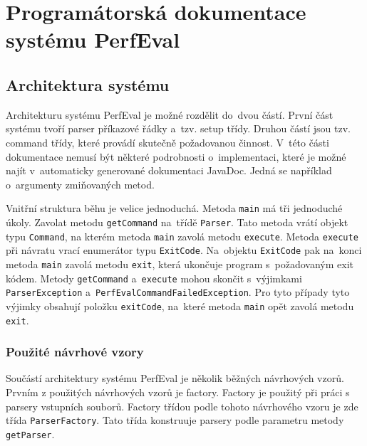 \chapter{Programátorská dokumentace systému PerfEval}

\section{Architektura systému}

Architekturu systému PerfEval je možné rozdělit do~dvou částí. První část systému tvoří
parser příkazové řádky a~tzv. setup třídy. Druhou částí jsou tzv. command třídy,
které provádí skutečně požadovanou činnost. V~této části dokumentace nemusí být
některé podrobnosti o~implementaci, které je možné najít v~automaticky generované dokumentaci
JavaDoc. Jedná se například o~argumenty zmiňovaných metod.

Vnitřní struktura běhu je velice jednoduchá. Metoda \lstinline{main} má tři jednoduché úkoly.
Zavolat metodu \lstinline{getCommand} na~třídě \lstinline{Parser}. Tato metoda vrátí objekt typu \lstinline{Command},
na kterém metoda \lstinline{main} zavolá metodu \lstinline{execute}. Metoda \lstinline{execute} při návratu vrací enumerátor
typu \lstinline{ExitCode}. Na~objektu \lstinline{ExitCode} pak na~konci metoda \lstinline{main} zavolá metodu \lstinline[keywords={}]{exit},
která ukončuje program s~požadovaným exit kódem. Metody \lstinline{getCommand} a~\lstinline{execute} mohou skončit
s~výjimkami \lstinline{ParserException} a~\lstinline{PerfEvalCommandFailedException}. Pro tyto případy tyto
výjimky obsahují položku \lstinline{exitCode}, na~které metoda \lstinline{main} opět zavolá metodu \lstinline[keywords={}]{exit}.

\subsection{Použité návrhové vzory}

Součástí architektury systému PerfEval je několik běžných návrhových vzorů.
Prvním z použitých návrhových vzorů je factory. Factory je použitý
při práci s parsery vstupních souborů. Factory třídou podle tohoto návrhového vzoru je
zde třída \lstinline{ParserFactory}. Tato třída konstruuje parsery podle parametru metody
\lstinline{getParser}.

